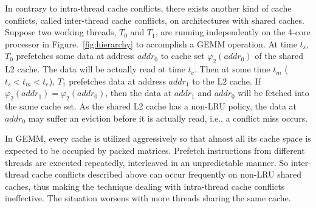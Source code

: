 In contrary to intra-thread cache conflicts,
there exists another kind of cache conflicts, called
inter-thread cache conflicts, on architectures with shared caches.
Suppose two working threads, $T_0$ and $T_1$, are running independently
on the 4-core processor in Figure.~\ref{fig:hierarchy}
to accomplish a GEMM operation.
At time $t_s$, $T_0$ prefetches some data at address $addr_0$
to cache set $\varphi_2(addr_0)$ of the shared L2 cache.
The data will be actually read at time $t_e$.
Then at some time $t_m$ ($t_s < t_m < t_e$),
$T_1$ prefetches data at address $addr_1$ to the L2 cache.
If $\varphi_2(addr_1)=\varphi_2(addr_0)$, then the
data at $addr_1$ and $addr_0$ will be fetched into the same cache set.
As the shared L2 cache has a non-LRU policy,
the data at $addr_0$ may suffer an eviction before it is actually read,
i.e., a conflict miss occurs.

In GEMM, every cache is utilized aggressively
so that almost all its cache space is expected to be occupied by packed matrices.
Prefetch instructions from different threads are executed repeatedly,
interleaved in an unpredictable manner.
So inter-thread cache conflicts described above
can occur frequently on non-LRU shared caches,
thus making the technique dealing with intra-thread cache conflicts ineffective.
The situation worsens with more threads sharing the same cache.

